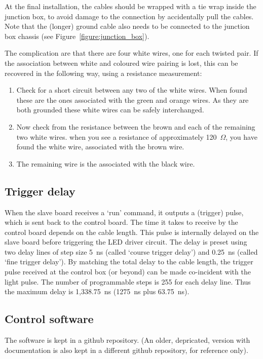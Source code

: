 At the final installation, the cables should be wrapped with a tie wrap inside the junction box, to avoid damage to the connection by accidentally pull the cables. Note that the (longer) ground cable also needs to be connected to the junction box chassis (see Figure~\ref{figure:junction_box}).

The complication are that there are four white wires, one for each twisted pair. 
If the association between white and coloured wire pairing is lost, this can be recovered in the following way, using a resistance measurement:
\begin{enumerate}
\item Check for a short circuit between any two of the white wires. When found these are the ones associated with the green and orange wires. As they are both grounded these white wires can be safely interchanged.
\item Now check from the resistance between the brown and each of the remaining two white wires. when you see a resistance of approximately 120~$\Omega$, you have found the white wire, associated with the brown wire.
\item The remaining wire is the associated with the black wire.
\end{enumerate}

\subsection*{Trigger delay}
When the slave board receives a `run' command, it outputs a (trigger) pulse, which is sent back to the control board. The time it takes to receive by the control board depends on the cable length. This pulse is internally delayed on the slave board before triggering the LED driver circuit. The delay is preset using two delay lines of step size 5~ns (called `course trigger delay') and 0.25~ns (called `fine trigger delay'). By matching the total delay to the cable length, the trigger pulse received at the control box (or beyond) can be made co-incident with the light pulse. The number of programmable steps is 255 for each delay line. Thus the maximum delay is 1,338.75~ns (1275~ns plus 63.75~ns).


\subsection*{Control software}

The software is kept in a  github repository\cite{GITHUB_SOFT}.
(An older, depricated, version with documentation is also kept in a different github repository\cite{GITHUB_TEST}, for reference only).
 
